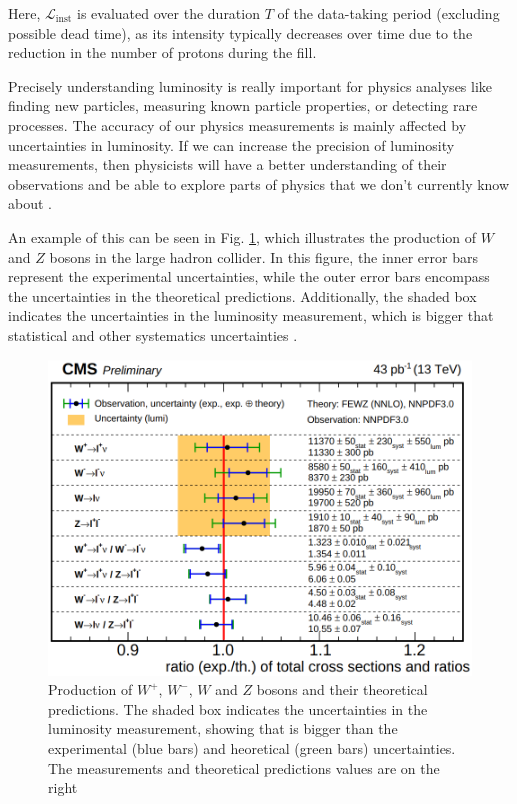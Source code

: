 Here, $\mathcal{L}_{\text{inst}}$ is evaluated over the duration $T$ of the data-taking period (excluding possible dead time), as its intensity typically decreases over time due to the reduction in the number of protons during the fill.

Precisely understanding luminosity is really important for physics analyses like finding new particles, measuring known particle properties, or detecting rare processes. The accuracy of our physics measurements is mainly affected by uncertainties in luminosity. If we can increase the precision of luminosity measurements, then physicists will have a better understanding of their observations and be able to explore parts of physics that we don't currently know about \cite{luminosity_importance}.

An example of this can be seen in Fig. \ref{lumi_incertainty}, which illustrates the production of $W$ and $Z$ bosons in the large hadron collider. In this figure, the inner error bars represent the experimental uncertainties, while the outer error bars encompass the uncertainties in the theoretical predictions. Additionally, the shaded box indicates the uncertainties in the luminosity measurement, which is bigger that statistical and other systematics uncertainties \cite{lumi_uncertainties}.

\begin{center}
  \begin{figure}[h]
    \centering
\includegraphics[scale=.28]{Chapter1/lumi_uncertainty.png} 
 \caption[Luminosity uncertainty in a process]{Production of $W^+$, $W^-$, $W$ and $Z$ bosons and their theoretical predictions. The shaded box indicates the uncertainties in the luminosity measurement, showing that is bigger than the experimental (blue bars) and heoretical (green bars) uncertainties. The measurements and theoretical predictions values are on the right}
    \label{lumi_incertainty}
  \end{figure}
\end{center}


